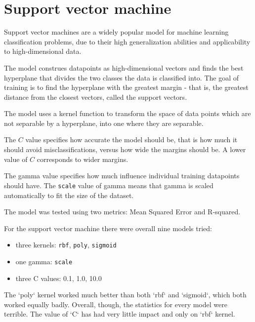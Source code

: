 \section{Support vector machine}
Support vector machines are a widely popular model for machine learning classification problems, due to their high generalization abilities and applicability to high-dimensional data.

The model construes datapoints as high-dimensional vectors and finds the best hyperplane that divides the two classes the data is classified into. The goal of training is to find the hyperplane with the greatest margin - that is, the greatest distance from the closest vectors, called the support vectors.

The model uses a kernel function to transform the space of data points which are not separable by a hyperplane, into one where they are separable.

The \(C\) value specifies how accurate the model should be, that is how much it should avoid misclassifications, versus how wide the margins should be. A lower value of \(C\) corresponds to wider margins.

The gamma value specifies how much influence individual training datapoints should have. The \verb|scale| value of gamma means that gamma is scaled automatically to fit the size of the dataset.



The model was tested using two metrics: Mean Squared Error and R-squared.

For the support vector machine there were overall nine models tried:

\begin{itemize}
	\item three kernels: \verb|rbf|, \verb|poly|, \verb|sigmoid|
	\item one gamma: \verb|scale|
	\item three C values: 0.1, 1.0, 10.0
\end{itemize}
The `poly` kernel worked much better than both `rbf` and `sigmoid`, which both worked equally badly. Overall, though, the statistics for every model were terrible. The value of `C` has had very little impact and only on `rbf` kernel.

